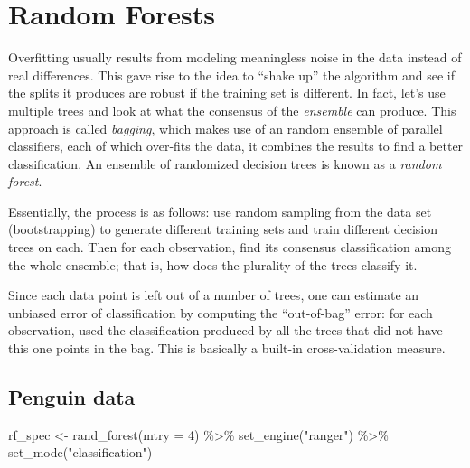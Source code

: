 \documentclass[
  letterpaper,
  DIV=11,
  numbers=noendperiod]{scrreprt}
\newenvironment{Shaded}{\begin{snugshade}}{\end{snugshade}}
\newcommand{\AttributeTok}[1]{\textcolor[rgb]{0.40,0.45,0.13}{#1}}
\newcommand{\DecValTok}[1]{\textcolor[rgb]{0.68,0.00,0.00}{#1}}
\newcommand{\FunctionTok}[1]{\textcolor[rgb]{0.28,0.35,0.67}{#1}}
\newcommand{\NormalTok}[1]{\textcolor[rgb]{0.00,0.23,0.31}{#1}}
\newcommand{\OtherTok}[1]{\textcolor[rgb]{0.00,0.23,0.31}{#1}}
\newcommand{\SpecialCharTok}[1]{\textcolor[rgb]{0.37,0.37,0.37}{#1}}
\newcommand{\StringTok}[1]{\textcolor[rgb]{0.13,0.47,0.30}{#1}}
\begin{document}
\hypertarget{random-forests}{%
\section{Random Forests}\label{random-forests}}

Overfitting usually results from modeling meaningless noise in the data
instead of real differences. This gave rise to the idea to ``shake up''
the algorithm and see if the splits it produces are robust if the
training set is different. In fact, let's use multiple trees and look at
what the consensus of the \emph{ensemble} can produce. This approach is
called \emph{bagging}, which makes use of an random ensemble of parallel
classifiers, each of which over-fits the data, it combines the results
to find a better classification. An ensemble of randomized decision
trees is known as a \emph{random forest}.

Essentially, the process is as follows: use random sampling from the
data set (bootstrapping) to generate different training sets and train
different decision trees on each. Then for each observation, find its
consensus classification among the whole ensemble; that is, how does the
plurality of the trees classify it.

Since each data point is left out of a number of trees, one can estimate
an unbiased error of classification by computing the ``out-of-bag''
error: for each observation, used the classification produced by all the
trees that did not have this one points in the bag. This is basically a
built-in cross-validation measure.

\hypertarget{penguin-data-2}{%
\subsection{Penguin data}\label{penguin-data-2}}

\begin{Shaded}
\begin{Highlighting}[]
\NormalTok{rf\_spec }\OtherTok{\textless{}{-}} \FunctionTok{rand\_forest}\NormalTok{(}\AttributeTok{mtry =} \DecValTok{4}\NormalTok{) }\SpecialCharTok{\%\textgreater{}\%}
  \FunctionTok{set\_engine}\NormalTok{(}\StringTok{"ranger"}\NormalTok{) }\SpecialCharTok{\%\textgreater{}\%}
  \FunctionTok{set\_mode}\NormalTok{(}\StringTok{"classification"}\NormalTok{)}
\end{Highlighting}
\end{Shaded}
\end{document}
